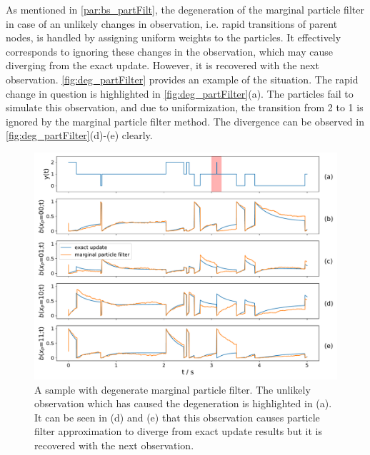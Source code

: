 As mentioned in \cref{par:bs_partFilt}, the degeneration of the marginal particle filter in case of an unlikely changes in observation, i.e. rapid transitions of parent nodes, is handled by assigning uniform weights to the particles. It effectively corresponds to ignoring these changes in the observation, which may cause diverging from the exact update. However, it is recovered with the next observation. \autoref{fig:deg_partFilter} provides an example of the situation. The rapid change in question is highlighted in \autoref{fig:deg_partFilter}(a). The particles fail to simulate this observation, and due to uniformization, the transition from 2 to 1 is ignored by the marginal particle filter method. The divergence can be observed in \autoref{fig:deg_partFilter}(d)-(e) clearly.
\begin{figure}[H]
	\begin{center}
		\includegraphics[width=.9\textwidth]{figures/degenerate_pf/belief_traj}
		\caption[Degenerate marginal particle filter]{A sample with degenerate marginal particle filter. The unlikely observation which has caused the degeneration is highlighted in (a). It can be seen in (d) and (e) that this observation causes particle filter approximation to diverge from exact update results but it is recovered with the next observation.}
		\label{fig:deg_partFilter}
	\end{center}
\end{figure}

